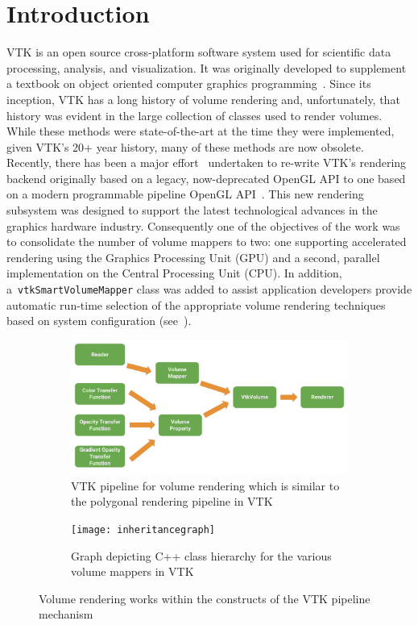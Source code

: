 \section{Introduction}
\label{introduction}
VTK is an open source cross-platform software system used for scientific data
processing, analysis, and visualization. It was originally developed to
supplement a textbook on object oriented computer graphics
programming~\citep{schroeder_visualization_2006, geveci_vtk_2012}.  Since its
inception, VTK has a long history of volume rendering and, unfortunately, that
history was evident in the large collection of classes used to render volumes.
While these methods were state-of-the-art at the time they were implemented,
given VTK's 20+ year history, many of these methods are now obsolete. Recently,
there has been a major effort~\citep{hanwell_visualization_2015} undertaken to
re-write VTK's rendering backend originally based on a legacy, now-deprecated
OpenGL API to one based on a modern programmable pipeline OpenGL
API~\citep{shreiner_opengl_2013}. This new rendering subsystem was designed to
support the latest technological advances in the graphics hardware industry.
Consequently one of the objectives of the work was to consolidate the number of
volume mappers to two: one supporting accelerated rendering using the Graphics
Processing Unit (GPU) and a second, parallel implementation on the Central
Processing Unit (CPU). In addition, a~\texttt{vtkSmartVolumeMapper} class was
added to assist application developers provide automatic run-time selection of
the appropriate volume rendering techniques based on system configuration
(see~).

\begin{figure}
  \centering
  \begin{subfigure}[b]{\columnwidth}
    \centering
    \includegraphics[width=\columnwidth, height=0.4\textheight]{vtk_volume_pipeline}
    \caption{VTK pipeline for volume rendering which is similar to the polygonal
      rendering pipeline in VTK}
    \label{fig:pipeline}
  \end{subfigure}\vfill
  \begin{subfigure}[b]{\columnwidth}
    \centering
    \texttt{[image: inheritancegraph]}
    \caption{Graph depicting C++ class hierarchy for
      the various volume mappers in VTK}
    \label{fig:inheritancegraph}
  \end{subfigure}
  \caption{Volume rendering works within the constructs of the VTK pipeline
    mechanism}
  \label{fig:pipeline-inheritancegraph}
\end{figure}

